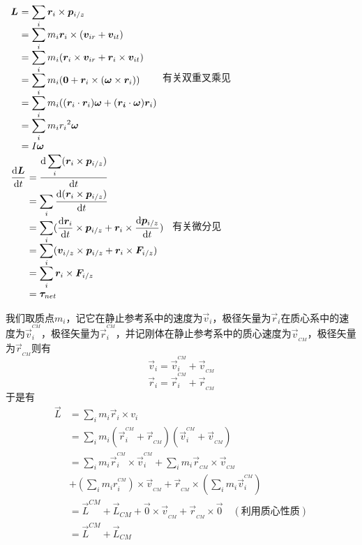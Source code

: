 \begin{prove}[Angular Momentum\qquad$\displaystyle\vec{L}=\sum_i\vec{r}_i\times\vec{p}_{i/z}=I\vec{\omega}\quad\&\quad\dfrac{\dif \vec{L}}{\dif t}=\vec{\tau}$]
	\qquad
	$
	\begin{array}{r@{\ }l}
		\vec{L}&=\displaystyle\sum_i\vec{r}_i\times\vec{p}_{i/z}\\
		&=\displaystyle\sum_im_i\vec{r}_i\times(\vec{v}_{ir}+\vec{v}_{it})\\
		&=\displaystyle\sum_im_i(\vec{r}_i\times\vec{v}_{ir}+\vec{r}_i\times\vec{v}_{it})\\
		&=\displaystyle\sum_im_i(\vec{0}+\vec{r}_i\times(\vec{\omega}\times\vec{r}_i))\\
		&=\displaystyle\sum_im_i((\vec{r}_i\cdot\vec{r}_i)\vec{\omega}+(\vec{r_i}\cdot\vec{\omega})\vec{r}_i)\\
		&=\displaystyle\sum_im_ir_i{}^2\vec{\omega}\\
		&=I\vec{\omega}
	\end{array}$有关双重叉乘见
	\\[2ex]
	\hspace*{0.9em}
	$
	\begin{array}{r@{\ }l}
		\dfrac{\dif\vec{L}}{\dif t}&=\dfrac{\dif\displaystyle\sum_i(\vec{r}_i\times\vec{p}_{i/z})}{\dif t}\\[1.4ex]
		&=\displaystyle\sum_i\dfrac{\dif(\vec{r}_i\times\vec{p}_{i/z})}{\dif t}\\
		&=\displaystyle\sum_i(\dfrac{\dif\vec{r}_i}{\dif t}\times\vec{p}_{i/z}+\vec{r}_i\times\dfrac{\dif\vec{p}_{i/z}}{\dif t})\\
		&=\displaystyle\sum_i(\vec{v}_{i/z}\times\vec{p}_{i/z}+\vec{r}_i\times\vec{F}_{i/z})\\
		&=\displaystyle\sum_i\vec{r}_i\times\vec{F}_{i/z}\\
		&=\vec{\tau}_{net}
	\end{array}$
	有关微分见
\end{prove}
\begin{prove}[$\vec{L}=\vec{L}_{CM}+\vec{L}^{CM}$]
	我们取质点$m_i$，记它在静止参考系中的速度为$\vec{v}_i$，极径矢量为$\vec{r}_i$在质心系中的速度为$\vec{v}^{^{CM}}_i$，极径矢量为$\vec{r}_i^{^{CM}}$，并记刚体在静止参考系中的质心速度为$\vec{v}_{_{CM}}$，极径矢量为$\vec{r}_{_{CM}}$则有
	\[\vec{v}_i=\vec{v}_i^{^{CM}}+\vec{v}_{_{CM}}\]
	\[\vec{r}_i=\vec{r}_i^{^{CM}}+\vec{r}_{_{CM}}\]
	于是有
	\begin{align*}
		\vec{L}&=\sum_im_i\vec{r}_i\times v_i\\
		&=\sum_im_i(\vec{r}_i^{^{CM}}+\vec{r}_{_{CM}})(\vec{v}_i^{^{CM}}+\vec{v}_{_{CM}})\\
		&=\sum_im_i\vec{r}_i^{^{CM}}\times\vec{v}_i^{^{CM}}+\sum_im_i\vec{r}_{_{CM}}\times\vec{v}_{_{CM}}\\
		&+(\sum_im_ir_i^{^{CM}})\times\vec{v}_{_{CM}}+\vec{r}_{_{CM}}\times(\sum_im_i\vec{v}_i^{^{CM}})\\
		&=\vec{L}^{CM}+\vec{L}_{CM}+\vec{0}\times\vec{v}_{_{CM}}+\vec{r}_{_{CM}}\times\vec{0}\quad(\text{利用质心性质})\\
		&=\vec{L}^{CM}+\vec{L}_{CM}
	\end{align*}
\end{prove}

